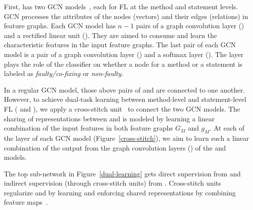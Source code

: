 \vspace{3pt}
 First, {\tool}
has two GCN models~\cite{kipf2016semi}, each for FL at the method and
statement levels. GCN processes the attributes of the nodes (vectors)
and their edges (relations) in feature graphs. Each GCN model has
$n-1$ pairs of a graph convolution layer () and a rectified
linear unit (). They are aimed to consume and learn the
characteristic features in the input feature graphs. The last pair of
each GCN model is a pair of a graph convolution layer ()
and a softmax layer (). The  layer plays
the role of the classifier on whether a node for a method or a
statement is labeled as {\em faulty/co-fixing} or {\em non-faulty}.



 In a
regular GCN model, those above pairs of  and 
are connected to one another. However, to achieve dual-task learning
between method-level and statement-level FL ( and
), we apply a cross-stitch unit~\cite{misra2016cross} to
connect the two GCN models. The sharing of representations between
 and  is modeled by learning a linear
combination of the input features in both feature graphs $G_M$ and
$g_M$. At each of the  layer of each GCN model
(Figure~\ref{cross-stitch}), we aim to learn such a linear combination
of the output from the graph convolution layers () of the
 and  models.

The top sub-network in Figure~\ref{dual-learning} gets direct
supervision from  and indirect supervision (through
cross-stitch units) from . Cross-stitch units regularize
 and  by learning and enforcing shared
representations by combining feature maps~\cite{misra2016cross}.


